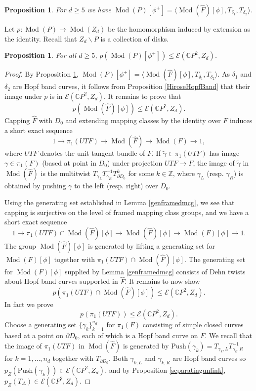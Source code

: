 \documentclass[10pt]{amsart}
\numberwithin{equation}{section}
\theoremstyle{plain}
\newtheorem{proposition}[theorem]{Proposition}
\theoremstyle{definition}
\theoremstyle{remark}
\DeclareMathOperator{\Mod}{Mod}
\begin{document}
\begin{proposition} \label{stabilizealonggenus1}
For $d \geq 5$ we have $\Mod(P)[\phi^+] = \langle \Mod(\widehat{F})[\phi], T_{\delta_1},T_{\delta_2}\rangle$.
\end{proposition}

Let $p : \Mod(P) \to \Mod(Z_d)$ be the homomorphism induced by extension as the identity. Recall that $Z_d\backslash P$ is a collection of disks. 
 

\begin{proposition} \label{framedchange}
For all $d \geq 5$, $p(\Mod(P)[\phi^+]) \leq \mathcal{E}(\mathbb{C}P^2,Z_d)$. 
\end{proposition}

\begin{proof}
By Proposition \ref{stabilizealonggenus1}, $\Mod(P)[\phi^+] = \langle \Mod(\widehat{F})[\phi], T_{\delta_1},T_{\delta_2} \rangle$. As $\delta_1$ and $\delta_2$ are Hopf band curves, it follows from Proposition \ref{HiroseHopfBand} that their image under $p$ is in $\mathcal{E}(\mathbb{C}P^2,Z_d)$. It remains to prove that \[p(\Mod(\widehat{F})[\phi]) \leq \mathcal{E}(\mathbb{C}P^2,Z_d).\]  Capping $\widehat{F}$ with $D_0$ and extending mapping classes by the identity over $F$ induces a short exact sequence 
$$ 1 \to \pi_1(UTF) \to \Mod(\widehat{F}) \to \Mod(F) \to 1,$$ 
where $UTF$ denotes the unit tangent bundle of $F$.  If  $\widetilde{\gamma} \in \pi_1(UTF)$ has image $\gamma \in \pi_1(F)$ (based at point in $D_0$) under projection $UTF\to F$, the image of $\widetilde{\gamma}$ in $\Mod(\widehat{F})$ is the multitwist $T_{\gamma_L}T_{\gamma_R}^{-1}T_{\partial D_0}^k$ for some $k \in \mathbb{Z}$, where $\gamma_L$ (resp. $\gamma_R$) is obtained by pushing $\gamma$ to the left (resp. right) over $D_0$. 

Using the generating set established in Lemma \ref{genframedmcg}, we see that capping is surjective on the level of framed mapping class groups, and we have a short exact sequence $$1 \to \pi_1(UTF) \cap \Mod(\widehat{F})[\phi] \to \Mod(\widehat{F})[\phi] \to \Mod(F)[\phi]\to 1.$$  The group $\Mod(\widehat{F})[\phi]$ is generated by lifting a generating set for $\Mod(F)[\phi]$ together with $\pi_1(UTF) \cap \Mod(\widehat{F})[\phi]$. The generating set for $\Mod(F)[\phi]$ supplied by Lemma \ref{genframedmcg} consists of Dehn twists about Hopf band curves supported in $\widehat{F}$. It remains to now show \[p(\pi_1(UTF) \cap \Mod(\widehat{F})[\phi]) \leq \mathcal{E}(\mathbb{C}P^2,Z_d).\] In fact we prove \[p(\pi_1(UTF))\leq \mathcal{E}(\mathbb{C}P^2,Z_d).\] Choose a generating set $\{\gamma_k\}_{k=1}^{n_d}$ for $\pi_1(F)$ consisting of simple closed curves based at a point on $ \partial D_0$, each of which is a Hopf band curve on $F$. We recall that the image of $\pi_1(UTF)$ in $\Mod(\widehat{F})$ is generated by $\textrm{Push}(\gamma_k) = T_{\gamma_k,L}T_{\gamma_k,R}^{-1}$ for $k = 1,\ldots, n_d$ together with $T_{\partial D_0}$. Both $\gamma_{k,L}$ and $\gamma_{k,R}$ are Hopf band curves so $p_Z(\textrm{Push}(\gamma_k)) \in \mathcal{E}(\mathbb{C}P^2,Z_d)$, and by Proposition \ref{separatingunlink}, $p_Z(T_{\Delta}) \in \mathcal{E}(\mathbb{C}P^2,Z_d)$.
\end{proof}
\end{document}
